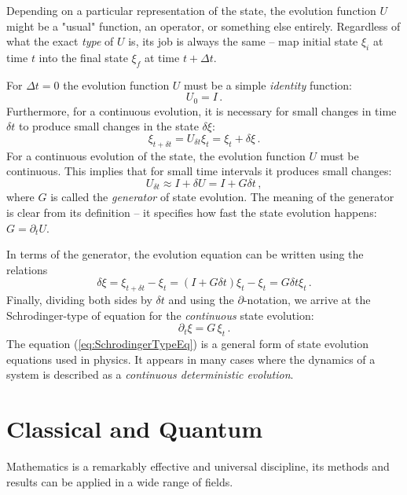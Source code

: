 Depending on a particular representation of the state, the evolution function $U$ might be a "usual" function, an operator, or something else entirely. Regardless of what the exact \emph{type} of $U$ is, its job is always the same -- map initial state $\xi_i$ at time $t$ into the final state $\xi_f$ at time $t+\Delta t$.
 
For $\Delta t = 0$ the evolution function $U$ must be a simple \emph{identity} function:
\[
U_0 = I\,.
\]
Furthermore, for a continuous evolution, it is necessary for small changes in time $\delta t$ to produce small changes in the state $\delta \xi$:
\[
\xi_{t+\delta t} = U_{\delta t} \xi_t = \xi_t + \delta \xi\,.
\] 
For a continuous evolution of the state, the evolution function $U$ must be continuous. This implies that for small time intervals it produces small changes:
\[
U_{\delta t} \approx I + \delta U = I + G\delta t\,,
\]
where $G$ is called the \emph{generator} of state evolution. The meaning of the generator is clear from its definition -- it specifies how fast the state evolution happens: $G=\partial_t U$.

In terms of the generator, the evolution equation can be written using the relations 
\[
\delta \xi = \xi_{t+\delta t} - \xi_t = \left(I + G\delta t\right)\xi_t - \xi_t = G\delta t\xi_t\,.
\]
Finally, dividing both sides by $\delta t$ and using the $\partial$-notation, we arrive at the Schrodinger-type of equation for the \emph{continuous} state evolution:
\begin{equation}
	\partial_t \xi = G\,\xi_t\,.
	\label{eq:SchrodingerTypeEq}
\end{equation}
The equation (\ref{eq:SchrodingerTypeEq}) is a general form of state evolution equations used in physics. It appears in many cases where the dynamics of a system is described as a \emph{continuous deterministic evolution}. 

\section{Classical and Quantum}
Mathematics is a remarkably effective and universal discipline, its
methods and
results can be applied in a wide range of fields.


